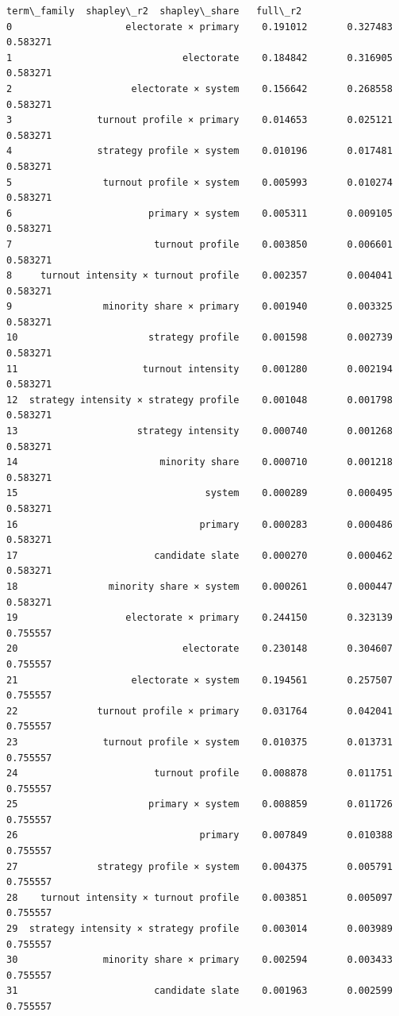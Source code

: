 \documentclass[11pt]{article}
\begin{document}
\begin{tcolorbox}[breakable, size=fbox, boxrule=.5pt, pad at break*=1mm, opacityfill=0]
\begin{Verbatim}[commandchars=\\\{\}]
                              term\_family  shapley\_r2  shapley\_share   full\_r2
0                    electorate × primary    0.191012       0.327483  0.583271
1                              electorate    0.184842       0.316905  0.583271
2                     electorate × system    0.156642       0.268558  0.583271
3               turnout profile × primary    0.014653       0.025121  0.583271
4               strategy profile × system    0.010196       0.017481  0.583271
5                turnout profile × system    0.005993       0.010274  0.583271
6                        primary × system    0.005311       0.009105  0.583271
7                         turnout profile    0.003850       0.006601  0.583271
8     turnout intensity × turnout profile    0.002357       0.004041  0.583271
9                minority share × primary    0.001940       0.003325  0.583271
10                       strategy profile    0.001598       0.002739  0.583271
11                      turnout intensity    0.001280       0.002194  0.583271
12  strategy intensity × strategy profile    0.001048       0.001798  0.583271
13                     strategy intensity    0.000740       0.001268  0.583271
14                         minority share    0.000710       0.001218  0.583271
15                                 system    0.000289       0.000495  0.583271
16                                primary    0.000283       0.000486  0.583271
17                        candidate slate    0.000270       0.000462  0.583271
18                minority share × system    0.000261       0.000447  0.583271
19                   electorate × primary    0.244150       0.323139  0.755557
20                             electorate    0.230148       0.304607  0.755557
21                    electorate × system    0.194561       0.257507  0.755557
22              turnout profile × primary    0.031764       0.042041  0.755557
23               turnout profile × system    0.010375       0.013731  0.755557
24                        turnout profile    0.008878       0.011751  0.755557
25                       primary × system    0.008859       0.011726  0.755557
26                                primary    0.007849       0.010388  0.755557
27              strategy profile × system    0.004375       0.005791  0.755557
28    turnout intensity × turnout profile    0.003851       0.005097  0.755557
29  strategy intensity × strategy profile    0.003014       0.003989  0.755557
30               minority share × primary    0.002594       0.003433  0.755557
31                        candidate slate    0.001963       0.002599  0.755557

\end{Verbatim}
\end{tcolorbox}
\end{document}
